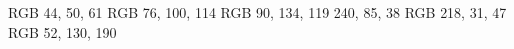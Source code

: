 \definecolor{mblack} {RGB} { 44,  50,  61}
\definecolor{mgray}  {RGB} { 76, 100, 114}
\definecolor{mgreen} {RGB} { 90, 134, 119}
\definecolor{morange}{RGB} {240,  85,  38}
\definecolor{mred}   {RGB} {218,  31,  47} 
\definecolor{mblue}  {RGB} { 52, 130, 190}
